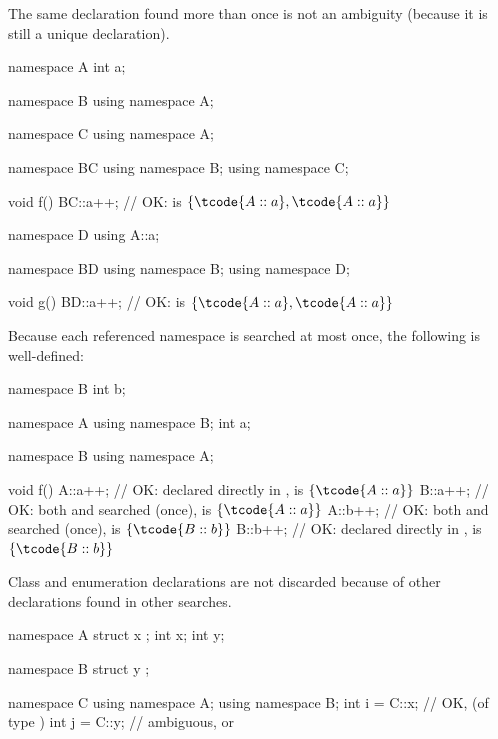 \pnum
\begin{note}
The same declaration found more than once is not an ambiguity (because
it is still a unique declaration).
\begin{example}
\begin{codeblock}
namespace A {
  int a;
}

namespace B {
  using namespace A;
}

namespace C {
  using namespace A;
}

namespace BC {
  using namespace B;
  using namespace C;
}

void f()
{
  BC::a++;          // OK:  is $\{ \tcode{A::a}, \tcode{A::a} \}$
}

namespace D {
  using A::a;
}

namespace BD {
  using namespace B;
  using namespace D;
}

void g()
{
  BD::a++;          // OK:  is $\{ \tcode{A::a}, \tcode{A::a} \}$
}
\end{codeblock}
\end{example}
\end{note}

\pnum
\begin{example}
Because each referenced namespace is searched at most once, the
following is well-defined:
\begin{codeblock}
namespace B {
  int b;
}

namespace A {
  using namespace B;
  int a;
}

namespace B {
  using namespace A;
}

void f()
{
  A::a++;           // OK:  declared directly in ,  is $\{ \tcode{A::a} \}$
  B::a++;           // OK: both  and  searched (once),  is $\{ \tcode{A::a} \}$
  A::b++;           // OK: both  and  searched (once),  is $\{ \tcode{B::b} \}$
  B::b++;           // OK:  declared directly in ,  is $\{ \tcode{B::b} \}$
}
\end{codeblock}
\end{example}

\pnum
\begin{note}
Class and enumeration declarations are not discarded
because of other declarations found in other searches.
\end{note}
\begin{example}
\begin{codeblock}
namespace A {
  struct x { };
  int x;
  int y;
}

namespace B {
  struct y { };
}

namespace C {
  using namespace A;
  using namespace B;
  int i = C::x;     // OK,  (of type )
  int j = C::y;     // ambiguous,  or 
}
\end{codeblock}
\end{example}

